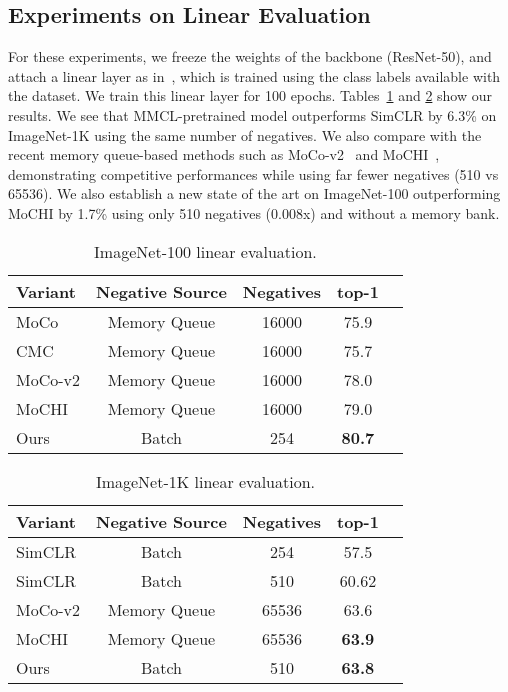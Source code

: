 \documentclass[letterpaper]{article} \usepackage{aaai22}  \usepackage{times}  \usepackage{helvet}  \usepackage{courier}  \usepackage[hyphens]{url}  \usepackage{graphicx} \urlstyle{rm} \def\UrlFont{\rm}  \usepackage{natbib}  \usepackage{caption} \DeclareCaptionStyle{ruled}{labelfont=normalfont,labelsep=colon,strut=off} \frenchspacing  \setlength{\pdfpagewidth}{8.5in}  \setlength{\pdfpageheight}{11in}
\begin{document}
\subsection{Experiments on Linear Evaluation}
For these experiments, we freeze the weights of the backbone (ResNet-50), and attach a linear layer as in~\cite{chen2020simple}, which is trained using the class labels available with the dataset. We train this linear layer for 100 epochs. Tables~\ref{tab: imagenet_100} and \ref{tab: imagenet_1k} show our results. We see that MMCL-pretrained model outperforms SimCLR by 6.3\% on ImageNet-1K using the same number of negatives. We also compare with the recent memory queue-based methods such as MoCo-v2~\cite{chen2020improved} and MoCHI~\cite{kalantidis2020hard}, demonstrating competitive performances while using far fewer negatives (510 vs 65536). We also establish a new state of the art on ImageNet-100 outperforming MoCHI by 1.7\% using only 510 negatives (0.008x) and without a memory bank.
\begin{table}[!htb]
    \centering
    \begin{tabular}{lcccr}
        \toprule
        Variant & Negative Source & Negatives & top-1 \\
        \toprule
        MoCo & Memory Queue & 16000 & 75.9 \\
        CMC & Memory Queue &16000 & 75.7 \\
        MoCo-v2  & Memory Queue & 16000 & 78.0 \\
        MoCHI & Memory Queue & 16000 & 79.0 \\
        \midrule
        Ours & Batch & 254 & \textbf{80.7} \\
        \bottomrule
        \end{tabular}
        \caption{ImageNet-100 linear evaluation.
        \label{tab: imagenet_100}
        }
\end{table}

\begin{table}[!htb]
    \centering
    \begin{tabular}{lcccr}
        \toprule
        Variant & Negative Source & Negatives & top-1 \\
        \toprule
        SimCLR  & Batch & 254 & 57.5 \\
        SimCLR  & Batch & 510 & 60.62 \\
        \midrule
        MoCo-v2 & Memory Queue & 65536 & 63.6 \\
        MoCHI & Memory Queue & 65536 & \textbf{63.9} \\
        \midrule
        Ours & Batch & 510 & \textbf{63.8} \\
        \bottomrule
        \end{tabular}
        \caption{ImageNet-1K linear evaluation. 
        \label{tab: imagenet_1k}}
\end{table}
\end{document}

